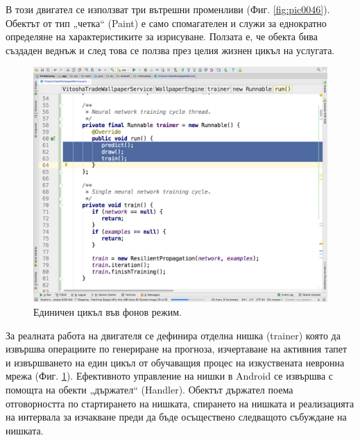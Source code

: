 \documentclass[book,14pt,oneside,openany]{memoir}
\begin{document}
В този двигател се използват три вътрешни променливи (Фиг. \ref{fig:pic0046}). Обектът от тип „четка“ (Paint) е само спомагателен и служи за еднократно определяне на характеристиките за изрисуване. Ползата е, че обекта бива създаден веднъж и след това се ползва през целия жизнен цикъл на услугата. 

\begin{figure}[h]
  \centering
  \includegraphics[height=0.45\pdfpageheight]{./images/pic0047.png}
  \caption{Единичен цикъл във фонов режим.}
\label{fig:pic0047}
\end{figure}
\FloatBarrier

За реалната работа на двигателя се дефинира отделна нишка (trainer) която да извършва операциите по генериране на прогноза, изчертаване на активния тапет и извършването на един цикъл от обучаващия процес на изкуствената невронна мрежа (Фиг. \ref{fig:pic0047}). Ефективното управление на нишки в Android се извършва с помощта на обекти „държател“ (Handler). Обектът държател поема отговорността по стартирането на нишката, спирането на нишката и реализацията на интервала за изчакване преди да бъде осъществено следващото събуждане на нишката. 
\end{document}
